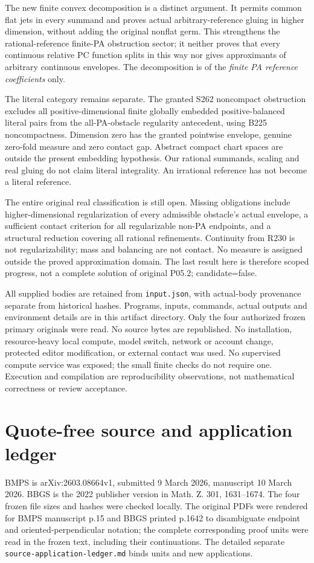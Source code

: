 \documentclass[11pt]{article}
\begin{document}
The new finite convex decomposition is a distinct argument. It
permits common flat jets in every summand and proves actual
arbitrary-reference gluing in higher dimension, without adding
the original nonflat germ. This strengthens the rational-reference
finite-PA obstruction sector; it neither proves that every
continuous relative PC function splits in this way nor gives
approximants of arbitrary continuous envelopes. The decomposition
is of the \emph{finite PA reference coefficients} only.

The literal category remains separate. The granted S262
noncompact obstruction excludes all positive-dimensional finite
globally embedded positive-balanced literal pairs from the
all-PA-obstacle regularity antecedent, using B225 noncompactness.
Dimension zero has the granted pointwise envelope, genuine
zero-fold measure and zero contact gap. Abstract compact chart
spaces are outside the present embedding hypothesis. Our rational
summands, scaling and real gluing do not claim literal integrality.
An irrational reference has not become a literal reference.

The entire original real classification is still open. Missing
obligations include higher-dimensional regularization of every
admissible obstacle's actual envelope, a sufficient contact
criterion for all regularizable non-PA endpoints, and a structural
reduction covering all rational refinements. Continuity from
R230 is not regularizability; mass and balancing are not contact.
No measure is assigned outside the proved approximation domain.
The last result here is therefore scoped progress, not a complete
solution of original P05.2; candidate=false.

All supplied bodies are retained from \texttt{input.json}, with
actual-body provenance separate from historical hashes.
Programs, inputs, commands, actual outputs and environment details
are in this artifact directory. Only the four authorized frozen
primary originals were read. No source bytes are republished.
No installation, resource-heavy local compute, model switch,
network or account change, protected editor modification, or
external contact was used. No supervised compute service was
exposed; the small finite checks do not require one. Execution
and compilation are reproducibility observations, not mathematical
correctness or review acceptance.

\appendix
\section{Quote-free source and application ledger}
BMPS is arXiv:2603.08664v1, submitted 9 March 2026, manuscript
10 March 2026. BBGS is the 2022 publisher version in Math. Z.
301, 1631--1674. The four frozen file sizes and hashes were
checked locally. The original PDFs were rendered for BMPS
manuscript p.15 and BBGS printed p.1642 to disambiguate endpoint
and oriented-perpendicular notation; the complete corresponding
proof units were read in the frozen text, including their
continuations. The detailed separate
\texttt{source-application-ledger.md} binds units and new applications.
\end{document}
